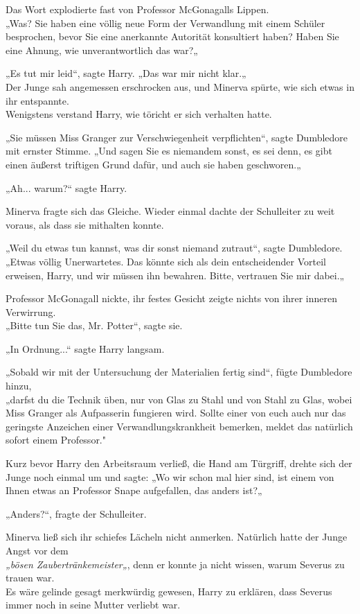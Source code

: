 {Das Wort explodierte fast von Professor McGonagalls Lippen.\\ „Was? Sie haben eine völlig neue Form der Verwandlung mit einem Schüler besprochen, bevor Sie eine anerkannte Autorität konsultiert haben? Haben Sie eine Ahnung, wie unverantwortlich das war?„

„Es tut mir leid“, sagte Harry. „Das war mir nicht klar.„\\ Der Junge sah angemessen erschrocken aus, und Minerva spürte, wie sich etwas in ihr entspannte.\\ Wenigstens verstand Harry, wie töricht er sich verhalten hatte.

„Sie müssen Miss Granger zur Verschwiegenheit verpflichten“, sagte Dumbledore mit ernster Stimme. „Und sagen Sie es niemandem sonst, es sei denn, es gibt einen äußerst triftigen Grund dafür, und auch sie haben geschworen.„

„Ah... warum?“ sagte Harry.

Minerva fragte sich das Gleiche. Wieder einmal dachte der Schulleiter zu weit voraus, als dass sie mithalten konnte.

„Weil du etwas tun kannst, was dir sonst niemand zutraut“, sagte Dumbledore.\\ „Etwas völlig Unerwartetes. Das könnte sich als dein entscheidender Vorteil erweisen, Harry, und wir müssen ihn bewahren. Bitte, vertrauen Sie mir dabei.„

Professor McGonagall nickte, ihr festes Gesicht zeigte nichts von ihrer inneren Verwirrung.\\ „Bitte tun Sie das, Mr. Potter“, sagte sie.

„In Ordnung...“ sagte Harry langsam.

„Sobald wir mit der Untersuchung der Materialien fertig sind“, fügte Dumbledore hinzu,\\ „darfst du die Technik üben, nur von Glas zu Stahl und von Stahl zu Glas, wobei Miss Granger als Aufpasserin fungieren wird. Sollte einer von euch auch nur das geringste Anzeichen einer Verwandlungskrankheit bemerken, meldet das natürlich sofort einem Professor."

Kurz bevor Harry den Arbeitsraum verließ, die Hand am Türgriff, drehte sich der Junge noch einmal um und sagte: „Wo wir schon mal hier sind, ist einem von Ihnen etwas an Professor Snape aufgefallen, das anders ist?„

„Anders?“, fragte der Schulleiter.

Minerva ließ sich ihr schiefes Lächeln nicht anmerken. Natürlich hatte der Junge Angst vor dem\\ \emph{„bösen Zaubertränkemeister„}, denn er konnte ja nicht wissen, warum Severus zu trauen war.\\ Es wäre gelinde gesagt merkwürdig gewesen, Harry zu erklären, dass Severus immer noch in seine Mutter verliebt war.

}
